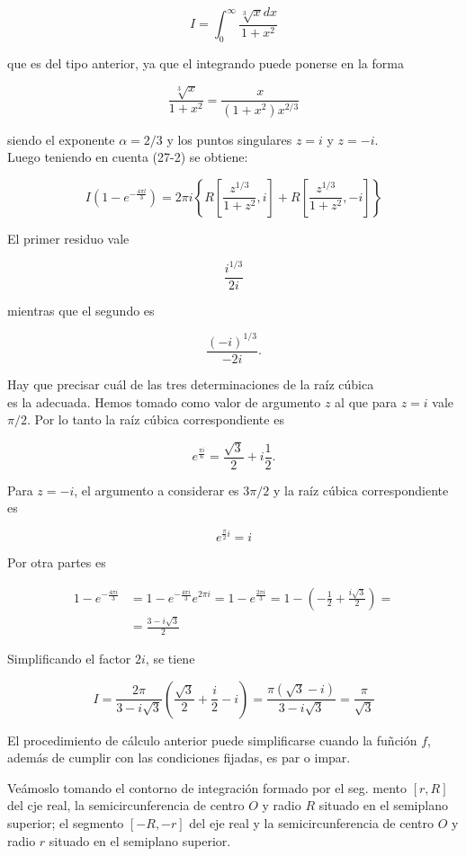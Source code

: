 \documentclass[10pt]{article}
\theoremstyle{plain}
\theoremstyle{definition}
\theoremstyle{remark}
\begin{document}
$$
I=\int_{0}^{\infty} \frac{\sqrt[3]{x} d x}{1+x^{2}}
$$

que es del tipo anterior, ya que el integrando puede ponerse en la forma

$$
\frac{\sqrt[3]{x}}{1+x^{2}}=\frac{x}{\left(1+x^{2}\right) x^{2 / 3}}
$$

siendo el exponente $\alpha=2 / 3$ y los puntos singulares $z=i$ y $z=-i$.\\
Luego teniendo en cuenta (27-2) se obtiene:

$$
I\left(1-e^{-\frac{4 \pi l}{3}}\right)=2 \pi i\left\{R\left[\frac{z^{1 / 3}}{1+z^{2}}, i\right]+R\left[\frac{z^{1 / 3}}{1+z^{2}},-i\right]\right\}
$$

El primer residuo vale

$$
\frac{i^{1 / 3}}{2 i}
$$

mientras que el segundo es

$$
\frac{(-i)^{1 / 3}}{-2 i} .
$$

Hay que precisar cuál de las tres determinaciones de la raíz cúbica\\
es la adecuada. Hemos tomado como valor de argumento $z$ al que para $z=i$ vale $\pi / 2$. Por lo tanto la raíz cúbica correspondiente es

$$
e^{\frac{\pi i}{6}}=\frac{\sqrt{3}}{2}+i \frac{1}{2} .
$$

Para $z=-i$, el argumento a considerar es $3 \pi / 2$ y la raíz cúbica correspondiente es

$$
e^{\frac{\pi}{2} i}=i
$$

Por otra partes es

$$
\begin{aligned}
1-e^{-\frac{4 \pi i}{3}} & =1-e^{-\frac{4 \pi i}{3}} e^{2 \pi i}=1-e^{\frac{2 \pi i}{3}}=1-\left(-\frac{1}{2}+\frac{i \sqrt{3}}{2}\right)= \\
& =\frac{3-i \sqrt{3}}{2}
\end{aligned}
$$

Simplificando el factor $2 i$, se tiene

$$
I=\frac{2 \pi}{3-i \sqrt{3}}\left(\frac{\sqrt{3}}{2}+\frac{i}{2}-i\right)=\frac{\pi(\sqrt{3}-i)}{3-i \sqrt{3}}=\frac{\pi}{\sqrt{3}}
$$

El procedimiento de cálculo anterior puede simplificarse cuando la fuñción $f$, además de cumplir con las condiciones fijadas, es par o impar.

Veámoslo tomando el contorno de integración formado por el seg. mento $[r, R]$ del cje real, la semicircunferencia de centro $O$ y radio $R$ situado en el semiplano superior; el segmento $[-R,-r]$ del eje real y la semicircunferencia de centro $O$ y radio $r$ situado en el semiplano superior.
\end{document}
